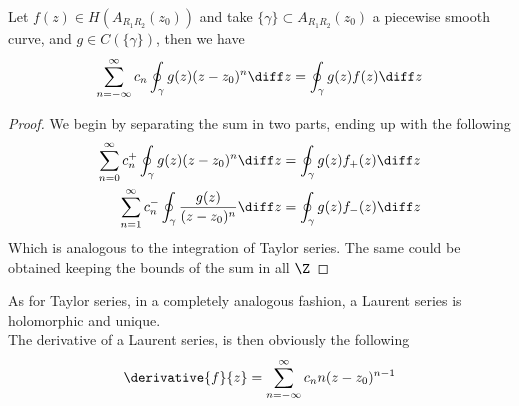 \documentclass[../mmf.tex]{subfiles}
\begin{document}
\begin{thm}
	Let $f(z)\in H\left(A_{R_1R_2}(z_0)\right)$ and take $\{\gamma\}\subset A_{R_1R_2}(z_0)$ a piecewise smooth curve, and $g\in C(\{\gamma\})$, then we have
	\begin{equation*}
		\sum_{n=-\infty}^\infty c_n\oint_\gamma g(z)(z-z_0)^n\diff z=\oint_\gamma g(z)f(z)\diff z
	\end{equation*}
\end{thm}
\begin{proof}
	We begin by separating the sum in two parts, ending up with the following
	\begin{equation*}
		\begin{aligned}
			\sum_{n=0}^\infty c_n^+\oint_\gamma g(z)(z-z_0)^n\diff z&=\oint_\gamma g(z)f_+(z)\diff z\\
			\sum_{n=1}^\infty c_n^-\oint_\gamma \frac{g(z)}{(z-z_0)^n}\diff z&=\oint_\gamma g(z)f_-(z)\diff z
		\end{aligned}
	\end{equation*}
	Which is analogous to the integration of Taylor series. The same could be obtained keeping the bounds of the sum in all $\Z$
\end{proof}
As for Taylor series, in a completely analogous fashion, a Laurent series is holomorphic and unique.\\
The derivative of a Laurent series, is then obviously the following
\begin{equation*}
	\derivative{f}{z}=\sum_{n=-\infty}^{\infty}c_nn(z-z_0)^{n-1}
\end{equation*}
\end{document}
